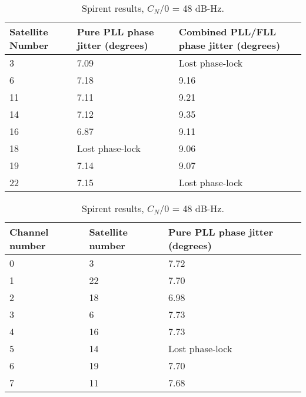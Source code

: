 \begin{table}[!htb]
\centering
\begin{tabular}{|l|l|l|}
\hline
\rowcolor[HTML]{C0C0C0} 
Satellite Number & Pure PLL phase jitter (degrees) & Combined PLL/FLL phase jitter (degrees) \\ \hline
3                & 7.09                            & Lost phase-lock                               \\ \hline
\rowcolor[HTML]{EFEFEF} 
6                & 7.18                            & 9.16                                    \\ \hline
11               & 7.11                            & 9.21                                    \\ \hline
\rowcolor[HTML]{EFEFEF} 
14               & 7.12                            & 9.35                                    \\ \hline
16               & 6.87                            & 9.11                                    \\ \hline
\rowcolor[HTML]{EFEFEF} 
18               & Lost phase-lock                          & 9.06                                    \\ \hline
19               & 7.14                            & 9.07                                    \\ \hline
\rowcolor[HTML]{EFEFEF} 
22               & 7.15                            & Lost phase-lock                               \\ \hline
\end{tabular}
\caption{Spirent results, $C_N/0$ = 48 dB-Hz.}
\label{tab:SpirentCNO48}
\end{table}


\begin{table}[!htb]
\centering
\begin{tabular}{|l|l|l|}
\hline
\rowcolor[HTML]{C0C0C0} 
Channel number & Satellite number & Pure PLL phase jitter (degrees)      \\ \hline
0              & 3                & 7.72 \\ \hline
\rowcolor[HTML]{EFEFEF} 
1              & 22               & 7.70 \\ \hline
2              & 18               & 6.98\\ \hline
\rowcolor[HTML]{EFEFEF} 
3              & 6                & 7.73 \\ \hline
4              & 16               & 7.73 \\ \hline
\rowcolor[HTML]{EFEFEF} 
5              & 14               & Lost phase-lock \\ \hline
6              & 19               & 7.70 \\ \hline
\rowcolor[HTML]{EFEFEF} 
7              & 11               & 7.68 \\ \hline
\end{tabular}
\label{tab:SpirentCNO42}
\caption{Spirent results, $C_N/0$ = 48 dB-Hz.}
\end{table}

